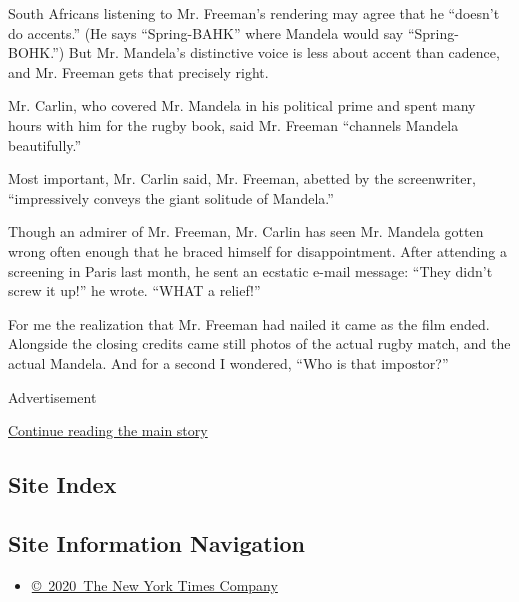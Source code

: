 South Africans listening to Mr. Freeman's rendering may agree that he
``doesn't do accents.'' (He says ``Spring-BAHK'' where Mandela would say
``Spring-BOHK.'') But Mr. Mandela's distinctive voice is less about
accent than cadence, and Mr. Freeman gets that precisely right.

Mr. Carlin, who covered Mr. Mandela in his political prime and spent
many hours with him for the rugby book, said Mr. Freeman ``channels
Mandela beautifully.''

Most important, Mr. Carlin said, Mr. Freeman, abetted by the
screenwriter, ``impressively conveys the giant solitude of Mandela.''

Though an admirer of Mr. Freeman, Mr. Carlin has seen Mr. Mandela gotten
wrong often enough that he braced himself for disappointment. After
attending a screening in Paris last month, he sent an ecstatic e-mail
message: ``They didn't screw it up!'' he wrote. ``WHAT a relief!''

For me the realization that Mr. Freeman had nailed it came as the film
ended. Alongside the closing credits came still photos of the actual
rugby match, and the actual Mandela. And for a second I wondered, ``Who
is that impostor?''

Advertisement

\protect\hyperlink{after-bottom}{Continue reading the main story}

\hypertarget{site-index}{%
\subsection{Site Index}\label{site-index}}

\hypertarget{site-information-navigation}{%
\subsection{Site Information
Navigation}\label{site-information-navigation}}

\begin{itemize}
\tightlist
\item
  \href{https://help.nytimes3xbfgragh.onion/hc/en-us/articles/115014792127-Copyright-notice}{©~2020~The
  New York Times Company}
\end{itemize}

